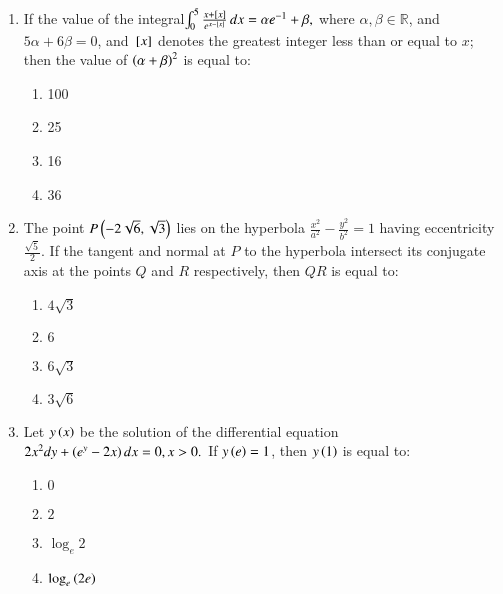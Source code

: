 \documentclass[journal,9pt,onecolumn]{IEEEtran}
\begin{document}
\begin{enumerate}
\item If the value of the integral$\int_0^5 \frac{x + {}\left[x\right] }{e^{x - {}\left[ x \right]}} \, dx = \alpha e^{-1} + \beta,$ where $\alpha, \beta \in \mathbb{R}$, and $5\alpha + 6\beta = 0$, and ${}\left[ x \right]$ denotes the greatest integer less than or equal to $x$; then the value of $\left(\alpha + \beta\right)^2$ is equal to:

\begin{multicols}{4}    
\begin{enumerate}
    \item 100
    \item 25
    \item 16
    \item 36
\end{enumerate}
\end{multicols}


\item The point $P\left(-2\sqrt{6}, \sqrt{3}\right)$ lies on the hyperbola $\frac{x^2}{a^2} - \frac{y^2}{b^2} = 1$ having eccentricity $\frac{\sqrt{5}}{2}$. If the tangent and normal at $P$ to the hyperbola intersect its conjugate axis at the points $Q$ and $R$ respectively, then $QR$ is equal to:
\begin{multicols}{4}
\begin{enumerate}
    \item $4\sqrt{3}$
    \item $6$
    \item $6\sqrt{3}$
    \item $3\sqrt{6}$
\end{enumerate}
\end{multicols}


 \item Let $y\left(x\right)$ be the solution of the differential equation $2x^2dy + \left(e^y - 2x\right)dx =0,  x > 0.$
If $y\left(e\right) = 1$, then $y\left(1\right)$ is equal to:
\begin{multicols}{4}    
\begin{enumerate}
    \item $0$
    \item $2$
    \item $\log_e2$
    \item $\log_e\left(2e\right)$
\end{enumerate}
\end{multicols}



\end{enumerate}
\end{document}
